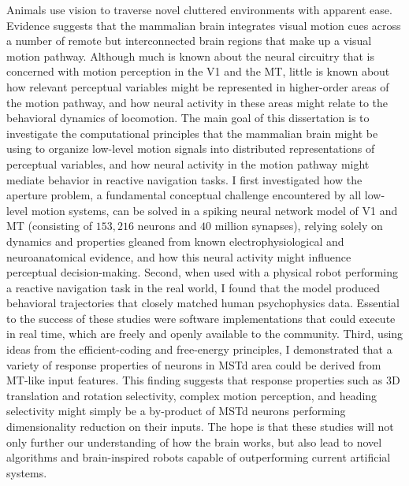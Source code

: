 \thesisabstract
{
Animals use vision to traverse novel cluttered environments with apparent ease.
Evidence suggests that the mammalian brain integrates visual motion cues across
a number of remote but interconnected brain regions that make up a visual motion
pathway. Although much is known about the neural circuitry that is concerned with
motion perception in the \acf{V1} and the \acf{MT}, little is known about 
how relevant perceptual variables might be represented in higher-order areas of 
the motion pathway, and how neural activity in these areas might relate to the
behavioral dynamics of locomotion. The main goal of this dissertation is to
investigate the computational principles that the mammalian brain might be using
to organize low-level motion signals into distributed representations of 
perceptual variables, and how neural activity in the motion pathway might
mediate behavior in reactive navigation tasks. 
I first investigated how the aperture problem, a fundamental conceptual challenge
encountered by all low-level motion systems, can be solved in a spiking neural
network model of \ac{V1} and \ac{MT} (consisting of $153,216$ neurons and $40$ 
million synapses), relying solely on dynamics and properties gleaned from known
electrophysiological and neuroanatomical evidence, and how this neural activity
might influence perceptual decision-making.
Second, when used with a physical robot performing a reactive navigation task 
in the real world, I found that the model produced behavioral trajectories that
closely matched human psychophysics data. 
Essential to the success of these studies were software implementations that 
could execute in real time, which are freely and openly available to the 
community. 
Third, using ideas from the efficient-coding and free-energy principles, I
demonstrated that a variety of response properties of neurons in \acf{MSTd}
area could be derived from \ac{MT}-like input features. This finding suggests 
that response properties such as 3D translation and rotation selectivity, 
complex motion perception, and heading selectivity might simply be a by-product 
of \ac{MSTd} neurons performing dimensionality reduction on their inputs. 
The hope is that these studies will not only further our understanding of how 
the brain works, but also lead to novel algorithms and brain-inspired robots
capable of outperforming current artificial systems.
}
